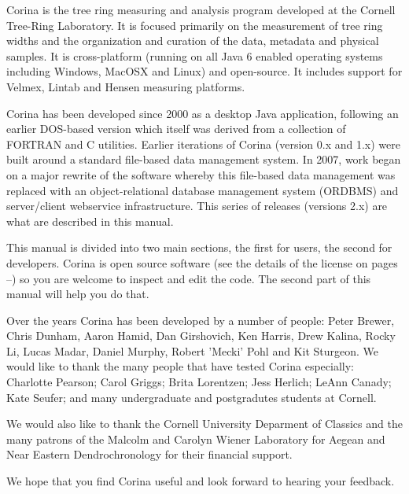 Corina is the tree ring measuring and analysis program developed at the Cornell Tree-Ring Laboratory. It is focused primarily on the measurement of tree ring widths and the organization and curation of the data, metadata and physical samples. It is cross-platform (running on all Java 6 enabled operating systems including Windows, MacOSX and Linux) and open-source. It includes support for Velmex, Lintab and Hensen measuring platforms.

Corina has been developed since 2000 as a desktop Java application, following an earlier DOS-based version which itself was derived from a collection of FORTRAN and C utilities. Earlier iterations of Corina (version 0.x and 1.x) were built around a standard file-based data management system. In 2007, work began on a major rewrite of the software whereby this file-based data management was replaced with an object-relational database management system (ORDBMS) and server/client webservice infrastructure. This series of releases (versions 2.x) are what are described in this manual.

This manual is divided into two main sections, the first for users, the second for developers.  Corina is open source software (see the details of the license on pages \pageref{txt:licenseStart}--\pageref{txt:licenseEnd}) so you are welcome to inspect and edit the code.  The second part of this manual will help you do that.

Over the years Corina has been developed by a number of people: Peter Brewer, Chris Dunham, Aaron Hamid, Dan Girshovich, Ken Harris, Drew Kalina, Rocky Li, Lucas Madar, Daniel Murphy, Robert 'Mecki' Pohl and Kit Sturgeon.  We would like to thank the many people that have tested Corina especially: Charlotte Pearson; Carol Griggs; Brita Lorentzen; Jess Herlich; LeAnn Canady; Kate Seufer; and many undergraduate and postgradutes students at Cornell.  

We would also like to thank the Cornell University Deparment of Classics and the many patrons of the Malcolm and Carolyn Wiener Laboratory for Aegean and Near Eastern Dendrochronology for their financial support.  

We hope that you find Corina useful and look forward to hearing your feedback.  




